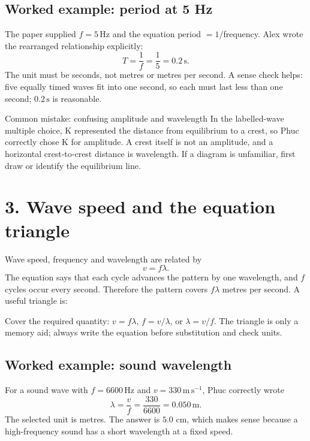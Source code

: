\documentclass[11pt,a4paper]{article}
\newcommand{\unit}[1]{\,\mathrm{#1}}
\begin{document}
\subsection*{Worked example: period at 5 Hz}
The paper supplied $f=5\,\mathrm{Hz}$ and the equation period $=1/$frequency. Alex wrote the rearranged relationship explicitly:
\[
T=\frac{1}{f}=\frac{1}{5}=0.2\unit{s}.
\]
The unit must be seconds, not metres or metres per second. A sense check helps: five equally timed waves fit into one second, so each must last less than one second; $0.2\,\mathrm{s}$ is reasonable.

\begin{mistakebox}{Common mistake: confusing amplitude and wavelength}
In the labelled-wave multiple choice, K represented the distance from equilibrium to a crest, so Phuc correctly chose K for amplitude. A crest itself is not an amplitude, and a horizontal crest-to-crest distance is wavelength. If a diagram is unfamiliar, first draw or identify the equilibrium line.
\end{mistakebox}

\section*{3. Wave speed and the equation triangle}
Wave speed, frequency and wavelength are related by
\[
\boxed{v=f\lambda}.
\]
The equation says that each cycle advances the pattern by one wavelength, and $f$ cycles occur every second. Therefore the pattern covers $f\lambda$ metres per second. A useful triangle is:
\begin{center}
\end{center}
Cover the required quantity: $v=f\lambda$, $f=v/\lambda$, or $\lambda=v/f$. The triangle is only a memory aid; always write the equation before substitution and check units.

\subsection*{Worked example: sound wavelength}
For a sound wave with $f=6600\,\mathrm{Hz}$ and $v=330\,\mathrm{m\,s^{-1}}$, Phuc correctly wrote
\[
\lambda=\frac{v}{f}=\frac{330}{6600}=0.050\unit{m}.
\]
The selected unit is metres. The answer is $5.0$ cm, which makes sense because a high-frequency sound has a short wavelength at a fixed speed.
\end{document}
